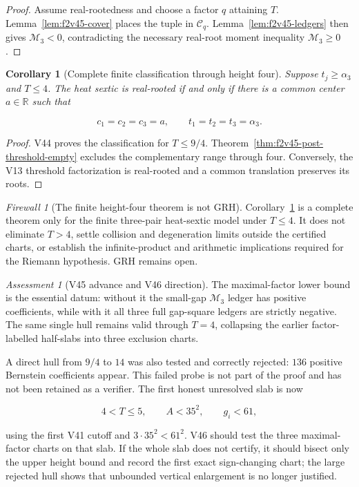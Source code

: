 \documentclass[11pt]{article}
\newtheorem{corollary}[theorem]{Corollary}
\theoremstyle{definition}
\theoremstyle{remark}
\newtheorem{assessment}[theorem]{Assessment}
\newtheorem{firewall}[theorem]{Firewall}
\begin{document}
\begin{proof}
Assume real-rootedness and choose a factor \(q\) attaining \(T\).
Lemma~\ref{lem:f2v45-cover} places the tuple in \(\mathcal C_q\).
Lemma~\ref{lem:f2v45-ledgers} then gives \(\mathcal M_3<0\), contradicting
the necessary real-root moment inequality \(\mathcal M_3\geq0\).
\end{proof}

\begin{corollary}[Complete finite classification through height four]
\label{cor:f2v45-through-four}
Suppose \(t_j\geq\alpha_3\) and \(T\leq4\).  The heat sextic is
real-rooted if and only if there is a common center \(a\in\mathbb R\)
such that

\[
 c_1=c_2=c_3=a,\qquad
 t_1=t_2=t_3=\alpha_3.
\tag{N45.14}
\]
\end{corollary}

\begin{proof}
V44 proves the classification for \(T\leq9/4\).
Theorem~\ref{thm:f2v45-post-threshold-empty} excludes the complementary
range through four.  Conversely, the V13 threshold factorization is
real-rooted and a common translation preserves its roots.
\end{proof}

\begin{firewall}[The finite height-four theorem is not GRH]
\label{fire:f2v45}
Corollary~\ref{cor:f2v45-through-four} is a complete theorem only for the
finite three-pair heat-sextic model under \(T\leq4\).  It does not
eliminate \(T>4\), settle collision and degeneration limits outside the
certified charts, or establish the infinite-product and arithmetic
implications required for the Riemann hypothesis.  GRH remains open.
\end{firewall}

\begin{assessment}[V45 advance and V46 direction]
\label{ass:f2v45}
The maximal-factor lower bound is the essential datum: without it the
small-gap \(\mathcal M_3\) ledger has positive coefficients, while with
it all three full gap-square ledgers are strictly negative.  The same
single hull remains valid through \(T=4\), collapsing the earlier
factor-labelled half-slabs into three exclusion charts.

A direct hull from \(9/4\) to \(14\) was also tested and correctly
rejected: \(136\) positive Bernstein coefficients appear.  This failed
probe is not part of the proof and has not been retained as a verifier.
The first honest unresolved slab is now

\[
 4<T\leq5,\qquad A<35^2,\qquad g_i<61,
\tag{N45.15}
\]

using the first V41 cutoff and \(3\cdot35^2<61^2\).  V46 should test the
three maximal-factor charts on that slab.  If the whole slab does not
certify, it should bisect only the upper height bound and record the
first exact sign-changing chart; the large rejected hull shows that
unbounded vertical enlargement is no longer justified.
\end{assessment}
\end{document}
